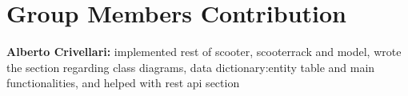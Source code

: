 \section{Group Members Contribution}


\begin{description}
\item \textbf{Alberto Crivellari:} implemented rest of scooter, scooterrack and model, wrote the section regarding class diagrams, data dictionary:entity table and main functionalities, and helped with rest api section

\end{description}
